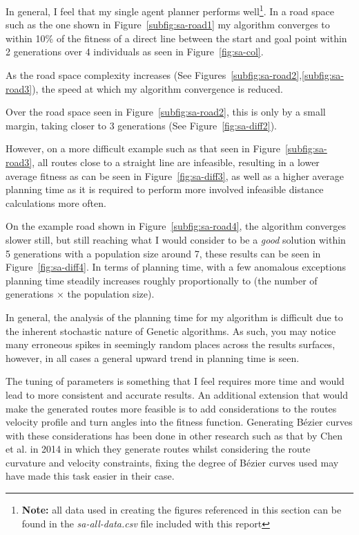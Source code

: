 
In general, I feel that my single agent planner performs well\footnote{\textbf{Note:} all data used in creating the figures referenced in this section can be found in the \textit{sa-all-data.csv} file included with this report }. In a road space such as the one shown in Figure~\ref{subfig:sa-road1} my algorithm converges to within 10\% of the fitness of a direct line between the start and goal point within 2 generations over 4 individuals as seen in Figure~\ref{fig:sa-col}.

As the road space complexity increases (See Figures~\ref{subfig:sa-road2},\ref{subfig:sa-road3}), the speed at which my algorithm convergence is reduced.

Over the road space seen in Figure~\ref{subfig:sa-road2}, this is only by a small margin, taking closer to 3 generations (See Figure~\ref{fig:sa-diff2}).

However, on a more difficult example such as that seen in Figure~\ref{subfig:sa-road3}, all routes close to a straight line are infeasible, resulting in a lower average fitness as can be seen in Figure~\ref{fig:sa-diff3}, as well as a higher average planning time as it is required to perform more involved infeasible distance calculations more often.

On the example road shown in Figure~\ref{subfig:sa-road4}, the algorithm converges slower still, but still reaching what I would consider to be a \textit{good} solution within 5 generations with a population size around 7, these results can be seen in Figure~\ref{fig:sa-diff4}. In terms of planning time, with a few anomalous exceptions planning time steadily increases roughly proportionally to (the number of generations $\times$ the population size).

In general, the analysis of the planning time for my algorithm is difficult due to the inherent stochastic nature of Genetic algorithms. As such, you may notice many erroneous spikes in seemingly random places across the results surfaces, however, in all cases a general upward trend in planning time is seen.

The tuning of parameters is something that I feel requires more time and would lead to more consistent and accurate results. An additional extension that would make the generated routes more feasible is to add considerations to the routes velocity profile and turn angles into the fitness function. Generating Bézier curves with these considerations has been done in other research such as that by Chen et al.\cite{chenQuarticBezierCurve2014} in 2014 in which they generate routes whilst considering the route curvature and velocity constraints, fixing the degree of Bézier curves used may have made this task easier in their case.

